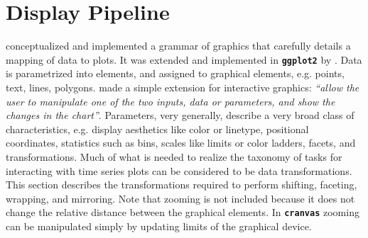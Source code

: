 \documentclass[12pt]{article}
\begin{document}
\section{Display Pipeline\label{sec:Pipeline}}

\citet{wilkinson2000language, wilkinson2001nvizn, wilkinson2006grammar}
conceptualized and implemented a grammar of graphics that
carefully details a mapping of data to plots. It was extended
and implemented in \texttt{\textbf{ggplot2}} by \citet{ggplot2}. Data is
parametrized into elements, and assigned to graphical elements,
e.g. points, text, lines, polygons. \citet{wills2012visualizing}
made a simple extension for interactive graphics: \textit{``allow
the user to manipulate one of the two inputs, data or parameters,
and show the changes in the chart''}. Parameters, very generally,
describe a very broad class of characteristics, e.g. display
aesthetics like color or linetype, positional coordinates,
statistics such as bins, scales like limits or color ladders,
facets, and transformations. Much of what is needed to realize
the taxonomy of tasks for interacting with time series plots
can be considered to be data transformations. This section
describes the transformations required to perform shifting,
faceting, wrapping, and mirroring. Note that zooming is not
included because it does not change the relative distance between
the graphical elements. In \texttt{\textbf{cranvas}} zooming can
be manipulated simply by updating limits of the graphical device.

\end{document}
